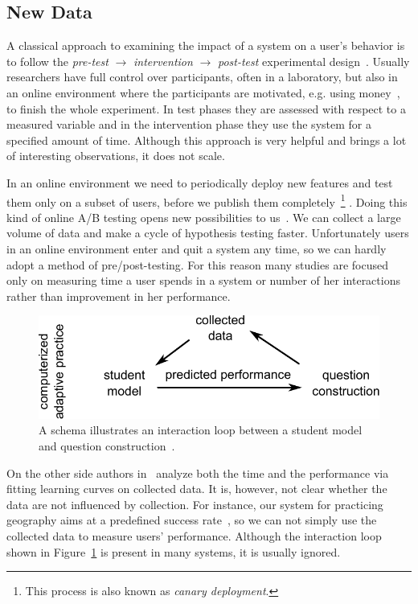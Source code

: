 \documentclass[table,color,cover,twoside,nolot,nolof]{fithesis3/fithesis3}
\begin{document}
\subsection{New Data}

A classical approach to examining the impact of a system on a user's
behavior is to follow the \emph{pre-test} $\rightarrow$ \emph{intervention}
$\rightarrow$ \emph{post-test} experimental design~\cite{dimitrov2003pretest}.
Usually researchers have full control over participants, often in a
laboratory, but also in an online environment where the participants are
motivated, e.g. using money~\cite{maass2015how}, to finish the whole
experiment. In test phases they are assessed with respect to a measured
variable and in the intervention phase they use the system for a specified
amount of time. Although this approach is very helpful and brings a lot of
interesting observations, it does not scale.

In an online environment we need to periodically deploy new features and
test them only on a subset of users, before we publish them
completely~\footnote{This process is also known as \emph{canary deployment}.} .
Doing this kind of online A/B testing opens new possibilities to
us~\cite{stamper2012rise}. We can collect a large volume of data and make a
cycle of hypothesis testing faster. Unfortunately users in an online environment
enter and quit a system any time, so we can hardly adopt a method of
pre/post-testing. For this reason many studies are focused only on measuring
time a user spends in a system or number of her
interactions~\cite{papousek2015impact,monterrat2015player}
rather than improvement in her performance.

\begin{figure}[h]
	\begin{center}
		\includegraphics[width=.7\textwidth]{figure/interaction_loop}
	\end{center}
	\caption{A schema illustrates an interaction loop between a student model and
		question construction~\cite{niznan2015exploring}.}
	\label{figure:interaction_loop}
\end{figure}

On the other side authors in~\cite{lomas2013optimizing} analyze both the time
and the performance via fitting learning curves on collected data. It is, however,
not clear whether the data are not influenced by collection. For instance, our
system for practicing geography aims at a predefined success
rate~\cite{papousek2014adaptive}, so we can not simply use the collected data
to measure users' performance. Although the interaction loop shown in
Figure~\ref{figure:interaction_loop} is present in many systems, it is usually
ignored.
\end{document}
